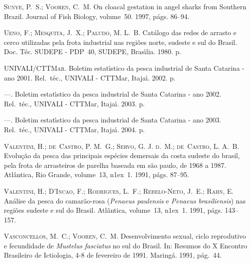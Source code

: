 \documentclass[a4paper,11pt,twoside,showtrims,onecolumn,openright,final]{memoir}
\begin{document}
\begin{thebibliography}{194}
\textsc{Sunye, P.~S.; Vooren, C.~M.}
\newblock On cloacal gestation in angel sharks from {S}outhern {B}razil.
\newblock Journal of Fish Biology, volume~50. 1997, p\'ags. 86--94.

\textsc{Ueno, F.; Mesquita, J.~X.; Paludo, M. L.~B.}
\newblock Cat\'alogo das redes de arrasto e cerco utilizadas pela frota
  industrial nas regi\~oes norte, sudeste e sul do {B}rasil.
\newblock Doc. T\'ec. SUDEPE - PDP~40, SUDEPE, Bras\'{\i}lia. 1980.
 p.

\textsc{UNIVALI/CTTMar}.
\newblock Boletim estat\'{\i}stico da pesca industrial de {S}anta {C}atarina -
  ano 2001.
\newblock Rel.\ t\'ec., UNIVALI - CTTMar, Itaja\'{\i}. 2002.
 p.

---.
\newblock Boletim estat\'{\i}stico da pesca industrial de {S}anta {C}atarina -
  ano 2002.
\newblock Rel.\ t\'ec., UNIVALI - CTTMar, Itaja\'{\i}. 2003.
 p.

---.
\newblock Boletim estat\'{\i}stico da pesca industrial de {S}anta {C}atarina -
  ano 2003.
\newblock Rel.\ t\'ec., UNIVALI - CTTMar, Itaja\'{\i}. 2004.
 p.

\textsc{Valentini, H.; de~Castro, P. M.~G.; Servo, G. J. d.~M.; de~Castro, L.
  A.~B.}
\newblock Evolução da pesca das principais espécies demersais da costa sudeste
  do brasil, pela frota de arrasteiros de parelha baseada em são paulo, de 1968
  a 1987.
\newblock Atlântica, Rio Grande, volume~13,
  n\raise1ex\hbox{}~1. 1991{}, p\'ags.
  87--95.

\textsc{Valentini, H.; D'Incao, F.; Rodrigues, L.~F.; Rebelo-Neto, J.~E.; Rahn,
  E.}
\newblock An\'alise da pesca do camar\~ao-rosa (\emph{{P}enaeus paulensis} e \emph{{P}enaeus
  brasiliensis}) nas regi\~oes sudeste e sul do {B}rasil.
\newblock Atl\^antica, volume~13, n\raise1ex\hbox{}~1.
  1991{}, p\'ags. 143--157.

\textsc{Vasconcellos, M.~C.; Vooren, C.~M.}
\newblock Desenvolvimento sexual, ciclo reprodutivo e fecundidade de \emph{{M}ustelus
  fasciatus} no sul do {B}rasil.
\newblock In: Resumos do {X} {E}ncontro {B}rasileiro de {I}ctiologia, 4-8 de
  fevereiro de 1991. Maring\'a. 1991, p\'ag.~44.


\end{thebibliography}
\end{document}
